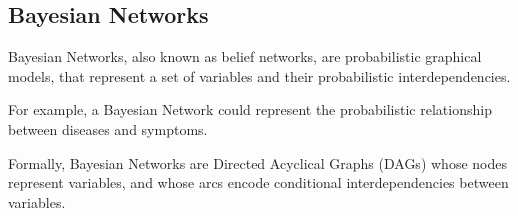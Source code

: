 \subsection{Bayesian Networks}

Bayesian Networks, also known as belief networks, are probabilistic graphical models, that
represent a set of variables and their probabilistic interdependencies.

For example, a Bayesian Network could represent the probabilistic relationship between
diseases and symptoms.

Formally, Bayesian Networks are Directed Acyclical Graphs (DAGs) whose nodes represent variables, and whose arcs encode
conditional interdependencies between variables.

